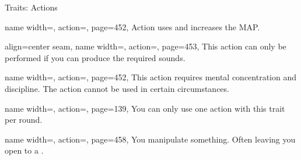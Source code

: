 \renewcommand{\PageBottomReferences}{%
    \hfill LCR = Legacy Core Rulebook
    \hfill DA = Dark Archive
    \hfill GnM = Gods and magic
    \hfill GMC = GM Core\\
    \hfill SoM = Secrets of Magic
    \hfill GG = Guns \& Gears
    \hfill TV = Treasure Vault
    \hfill AG = Ancesty Guide
    \hfill ME = Magwani Expanse
    \hfill Le = Ledgends
}%
\setlength{\parindent}{0mm}%
\begin{PageFront}
    \begin{Tables}{\frontTableHeight}
        \begin{Table}{Traits: Actions}
            \begin{entry}{}{%
                name width=\conditionLength,%
                action=\Attack,
                page=452,
            }
                Action uses  and increases the MAP. \hfill{}
            \end{entry}
            \begin{entry}{}{%
                align=center seam,
                name width=\conditionLength,%
                action=\Auditory,
                page=453,
            }
                This action can only be performed if you can produce the required sounds.\\ 
            \end{entry}
            \begin{entry}{}{%
                name width=\conditionLength,%
                action=\Concentrate,
                page=452,
            }
                This action requires mental concentration and discipline. The action cannot be used in certain
                circumstances.
            \end{entry}
            \begin{entry}{}{%
                name width=\conditionLength,%
                action=\Flourish,
                page=139,
            }
                You can only use one action with this trait per round.
            \end{entry}
            \begin{entry}{}{%
                name width=\conditionLength,%
                action=\Manipulate,
                page=458,
            }
                You manipulate something. Often leaving you open to a .

\end{entry}
\end{Table}
\end{Tables}
\end{PageFront}
